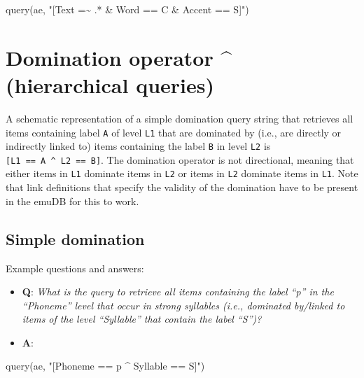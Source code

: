 \documentclass[
]{book}
\newenvironment{Shaded}{\begin{snugshade}}{\end{snugshade}}
\newcommand{\FunctionTok}[1]{\textcolor[rgb]{0.00,0.00,0.00}{#1}}
\newcommand{\NormalTok}[1]{#1}
\newcommand{\StringTok}[1]{\textcolor[rgb]{0.31,0.60,0.02}{#1}}
\providecommand{\tightlist}{%
  \setlength{\itemsep}{0pt}\setlength{\parskip}{0pt}}
\begin{document}
\begin{Shaded}
\begin{Highlighting}[]
\FunctionTok{query}\NormalTok{(ae, }\StringTok{"[Text =\textasciitilde{} .* \& Word == C \& Accent == S]"}\NormalTok{)}
\end{Highlighting}
\end{Shaded}

\hypertarget{domination-operator-hierarchical-queries}{%
\section{Domination operator \^{} (hierarchical queries)}\label{domination-operator-hierarchical-queries}}

A schematic representation of a simple domination query string that retrieves all items containing label \texttt{A} of level \texttt{L1} that are dominated by (i.e., are directly or indirectly linked to) items containing the label \texttt{B} in level \texttt{L2} is \texttt{{[}L1\ ==\ A\ \^{}\ L2\ ==\ B{]}}. The domination operator is not directional, meaning that either items in \texttt{L1} dominate items in \texttt{L2} or items in \texttt{L2} dominate items in \texttt{L1}. Note that link definitions that specify the validity of the domination have to be present in the emuDB for this to work.

\hypertarget{simple-domination}{%
\subsection{Simple domination}\label{simple-domination}}

Example questions and answers:

\begin{itemize}
\tightlist
\item
  \textbf{Q}: \emph{What is the query to retrieve all items containing the label ``p'' in the ``Phoneme'' level that occur in strong syllables (i.e., dominated by/linked to items of the level ``Syllable'' that contain the label ``S'')?}
\item
  \textbf{A}:
\end{itemize}

\begin{Shaded}
\begin{Highlighting}[]
\FunctionTok{query}\NormalTok{(ae, }\StringTok{"[Phoneme == p \^{} Syllable == S]"}\NormalTok{)}
\end{Highlighting}
\end{Shaded}
\end{document}
